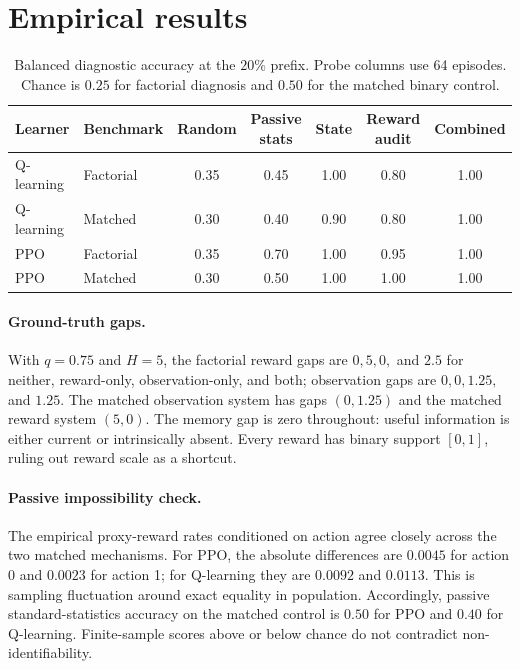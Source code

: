 \documentclass[9pt,twocolumn]{extarticle}
\begin{document}
\section{Empirical results}

\begin{table}[t]
\centering
\small
\caption{Balanced diagnostic accuracy at the $20\%$ prefix. Probe columns use
64 episodes. Chance is $0.25$ for factorial diagnosis and $0.50$ for the matched
binary control.}
\label{tab:main-results}
\begin{tabular}{llccccc}
\toprule
Learner & Benchmark & Random & Passive stats & State & Reward audit & Combined\\
\midrule
Q-learning & Factorial & 0.35 & 0.45 & 1.00 & 0.80 & 1.00\\
Q-learning & Matched   & 0.30 & 0.40 & 0.90 & 0.80 & 1.00\\
PPO        & Factorial & 0.35 & 0.70 & 1.00 & 0.95 & 1.00\\
PPO        & Matched   & 0.30 & 0.50 & 1.00 & 1.00 & 1.00\\
\bottomrule
\end{tabular}
\end{table}

\paragraph{Ground-truth gaps.}
With $q=0.75$ and $H=5$, the factorial reward gaps are $0,5,0,$ and $2.5$ for
neither, reward-only, observation-only, and both; observation gaps are
$0,0,1.25,$ and $1.25$. The matched observation system has gaps $(0,1.25)$ and
the matched reward system $(5,0)$. The memory gap is zero throughout: useful
information is either current or intrinsically absent. Every reward has binary
support $[0,1]$, ruling out reward scale as a shortcut.

\paragraph{Passive impossibility check.}
The empirical proxy-reward rates conditioned on action agree closely across
the two matched mechanisms. For PPO, the absolute differences are $0.0045$ for
action 0 and $0.0023$ for action 1; for Q-learning they are $0.0092$ and
$0.0113$. This is sampling fluctuation around exact equality in population.
Accordingly, passive standard-statistics accuracy on the matched control is
$0.50$ for PPO and $0.40$ for Q-learning. Finite-sample scores above or below
chance do not contradict non-identifiability.
\end{document}
